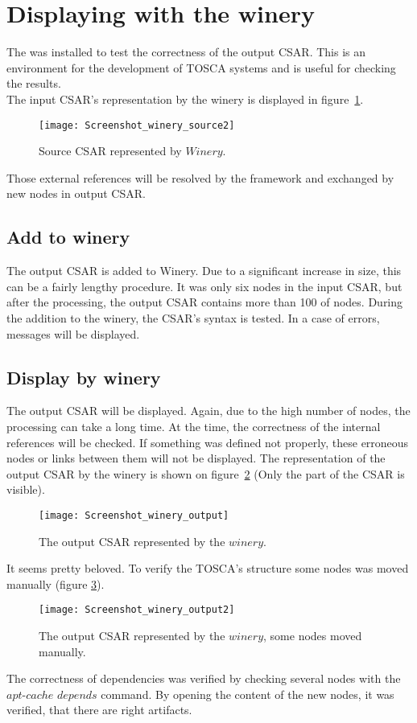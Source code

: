 \section{Displaying with the winery}\label{sec:checkwin}
 The  was installed to test the correctness of the output CSAR. 
 This is an environment for the development of TOSCA systems and is useful for checking the results. \\
 The input CSAR's representation by the winery is displayed in figure~\ref{fig:winery_source2}.
\begin{figure}[ht]   
	\centering
	\texttt{[image: Screenshot\_winery\_source2]}
	\caption{Source CSAR represented by $Winery$.}
	\label{fig:winery_source2}
\end{figure}
 Those external references will be resolved by the framework and exchanged by new nodes in output CSAR. 
 \subsection*{Add to winery}
 The output CSAR is added to Winery.
 Due to a significant increase in size, this can be a fairly lengthy procedure.
 It was only six nodes in the input CSAR, but after the processing, the output CSAR contains more than 100 of nodes.
 During the addition to the winery, the CSAR's syntax is tested.
 In a case of errors, messages will be displayed.
 \subsection*{Display by winery}
 The output CSAR will be displayed.
 Again, due to the high number of nodes, the processing can take a long time. 
 At the time, the correctness of the internal references will be checked.
 If something was defined not properly, these erroneous nodes or links between them will not be displayed.
The representation of the output CSAR by the winery is shown on figure~\ref{fig:winery_output} (Only the part of the CSAR is visible).
\begin{figure}[ht]   
	\centering
	\texttt{[image: Screenshot\_winery\_output]}  
	\caption{The output CSAR represented by the $winery$.}
	\label{fig:winery_output}
\end{figure}
 It seems pretty beloved.
 To verify the TOSCA's structure some nodes was moved manually (figure \ref{fig:winery_output2}). 
 \begin{figure}[ht]   
 	\centering
 	\texttt{[image: Screenshot\_winery\_output2]}
 	\caption{The output CSAR represented by the $winery$, some nodes moved manually.}
 	\label{fig:winery_output2}
 \end{figure}
 The correctness of dependencies was verified by checking several nodes with the $apt$-$cache$ $depends$ command.
 By opening the content of the new nodes, it was verified, that there are right artifacts.

